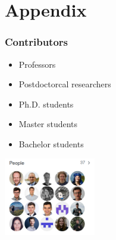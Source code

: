   \section{Appendix}
  \begin{frame}\frametitle{Contributors}\vspace{1.25cm}

  	\begin{multicols}{2}

    \begin{itemize}\setlength\itemsep{1em}
  		\item Professors
  		\item Postdoctorcal researchers
  		\item Ph.D. students
      \item Master students
      \item Bachelor students
  	\end{itemize}\vspace{0.3cm}

    \columnbreak

    \hspace{1.3cm}\includegraphics[width=0.30\textwidth]{material/crop-ose-members}


    	  \end{multicols}

  \end{frame}

\begin{frame}
\nocite{Keane.1997}
\end{frame}


\section{\refname}

\begin{frame}[allowframebreaks]{\insertsection}

\begin{refcontext}[sorting=nyt]
	\printbibliography[heading=none]
\end{refcontext}

\end{frame}
